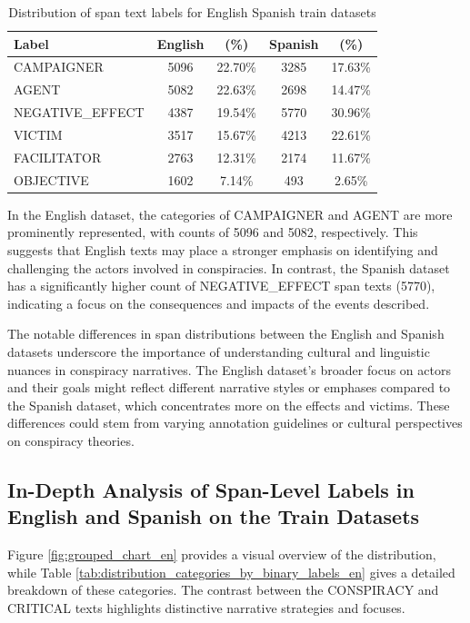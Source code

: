 \documentclass{Configuration_Files/PoliMi3i_thesis}
\begin{document}
\begin{table}[H]
    \centering
    \begin{tabular}{lcccc}
        \hline
        \textbf{Label} & \textbf{English} & \textbf{(\%)} & \textbf{Spanish} & \textbf{(\%)} \\
        \hline
        CAMPAIGNER       & 5096 & 22.70\% & 3285 & 17.63\% \\
        AGENT            & 5082 & 22.63\% & 2698 & 14.47\% \\
        NEGATIVE\_EFFECT & 4387 & 19.54\% & 5770 & 30.96\% \\
        VICTIM           & 3517 & 15.67\% & 4213 & 22.61\% \\
        FACILITATOR      & 2763 & 12.31\% & 2174 & 11.67\% \\
        OBJECTIVE        & 1602 & 7.14\%  & 493  & 2.65\% \\
        \hline
    \end{tabular}
    \caption{Distribution of span text labels for English Spanish train datasets}
    \label{tab:label_distribution_2}
\end{table}
\FloatBarrier

In the English dataset, the categories of CAMPAIGNER and AGENT are more prominently represented, with counts of 5096 and 5082, respectively. This suggests that English texts may place a stronger emphasis on identifying and challenging the actors involved in conspiracies. In contrast, the Spanish dataset has a significantly higher count of NEGATIVE\_EFFECT span texts (5770), indicating a focus on the consequences and impacts of the events described.

The notable differences in span distributions between the English and Spanish datasets underscore the importance of understanding cultural and linguistic nuances in conspiracy narratives. The English dataset's broader focus on actors and their goals might reflect different narrative styles or emphases compared to the Spanish dataset, which concentrates more on the effects and victims. These differences could stem from varying annotation guidelines or cultural perspectives on conspiracy theories.

\subsection{In-Depth Analysis of Span-Level Labels in English and Spanish on the Train Datasets}
Figure \ref{fig:grouped_chart_en} provides a visual overview of the distribution, while Table \ref{tab:distribution_categories_by_binary_labels_en} gives a detailed breakdown of these categories. The contrast between the CONSPIRACY and CRITICAL texts highlights distinctive narrative strategies and focuses. 
\end{document}
